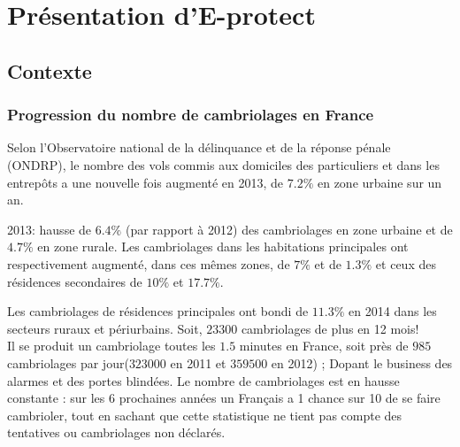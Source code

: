\chapter{Présentation d'E-protect}

\section{Contexte}

\subsection*{Progression du nombre de cambriolages en France}

Selon l'Observatoire national de la délinquance et de la réponse pénale (ONDRP), le nombre des vols commis aux domiciles des particuliers et dans les entrepôts a une nouvelle fois augmenté en 2013, de $7.2\%$ en zone urbaine sur un an.

2013: hausse de $6.4\%$ (par rapport à 2012) des cambriolages en zone urbaine et de $4.7\%$ en zone rurale. Les cambriolages dans les habitations principales ont respectivement augmenté, dans ces mêmes zones, de $7\%$ et de $1.3\%$ et ceux des résidences secondaires de $10\%$ et $17.7\%$.

Les cambriolages de résidences principales ont bondi de $11.3\%$ en 2014 dans les secteurs ruraux et périurbains. Soit, $23300$ cambriolages de plus en 12 mois!\\

Il se produit un cambriolage toutes les $1.5$ minutes en France, soit près de $985$ cambriolages par jour($323000$ en 2011 et $359500$ en 2012) ; Dopant le business des alarmes et des portes blindées. Le nombre de cambriolages est en hausse constante : sur les 6 prochaines années un Français a 1 chance sur 10 de se faire cambrioler, tout en sachant que cette statistique ne tient pas compte des tentatives ou cambriolages non déclarés.\\


